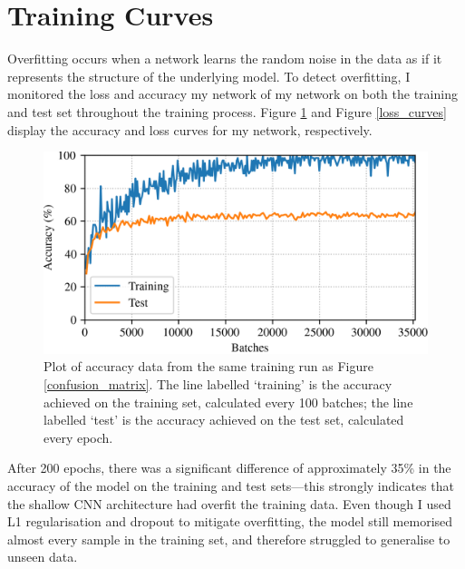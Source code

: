 \documentclass[conference]{IEEEtran}
\begin{document}
\section{Training Curves}

Overfitting occurs when a network learns the random noise in the data as if it represents the structure of the underlying model.
To detect overfitting, I monitored the loss and accuracy my network of my network on both the training and test set throughout the training process.
Figure \ref{accuracy_curves} and Figure \ref{loss_curves} display the accuracy and loss curves for my network, respectively.

\begin{figure}[htbp]
    \centerline{\includegraphics[width=\columnwidth]{accuracy.png}}
    \caption{
        Plot of accuracy data from the same training run as Figure \ref{confusion_matrix}.
        The line labelled `training' is the accuracy achieved on the training set, calculated every 100 batches; the line labelled `test' is the accuracy achieved on the test set, calculated every epoch.}
    \label{accuracy_curves}
\end{figure}

After 200 epochs, there was a significant difference of approximately 35\% in the accuracy of the model on the training and test sets---this strongly indicates that the shallow CNN architecture had overfit the training data.
Even though I used L1 regularisation and dropout to mitigate overfitting, the model still memorised almost every sample in the training set, and therefore struggled to generalise to unseen data.
\end{document}
